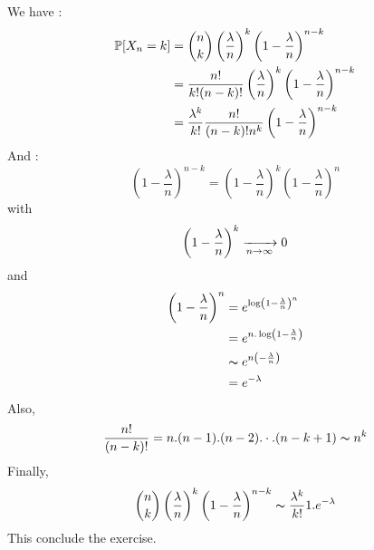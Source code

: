 \begin{solution}
  We have :
  \begin{align*}
    \mathbb{P}[X_n = k] & = \binom{n}{k} \left( \frac{\lambda}{n} \right)^k \left(  1- \frac{\lambda}{n} \right)^{n-k}        \\
                    & = \frac{n!}{k!(n-k)!} \left( \frac{\lambda}{n} \right)^k \left(  1- \frac{\lambda}{n} \right)^{n-k} \\
                    & = \frac{\lambda^k}{k!} \frac{n!}{(n-k)! n^k} \left(  1- \frac{\lambda}{n} \right)^{n-k}
  \end{align*}
  And :
  $$ \left(  1- \frac{\lambda}{n} \right)^{n-k} = \left(  1- \frac{\lambda}{n} \right)^{k} \left(  1- \frac{\lambda}{n} \right)^{n} $$
  with
  $$ \left(  1- \frac{\lambda}{n} \right)^{k} \xrightarrow[n \to \infty]{} 0 $$
  and
  \begin{align*}
    \left(  1- \frac{\lambda}{n} \right)^n & = e^{\log\left(  1- \frac{\lambda}{n} \right)^n}  \\
                                           & = e^{n.\log\left(  1- \frac{\lambda}{n} \right)}  \\
                                           & \thicksim e^{n\left( - \frac{\lambda}{n} \right)} \\
                                           & = e^{-\lambda}
  \end{align*}
  Also,
  $$\frac{n!}{(n-k)!}= n.(n-1).(n-2). \cdot . (n-k+1) \thicksim n^k $$
  Finally,
  $$ \binom{n}{k} \left( \frac{\lambda}{n} \right)^k \left(  1- \frac{\lambda}{n} \right)^{n-k} \thicksim \frac{\lambda^k}{k!} 1. e^{-\lambda} $$
  This conclude the exercise.
\end{solution}